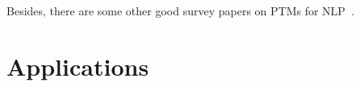 \documentclass[fleqn]{SCYE-arxiv}
\begin{document}
\begin{multicols}{2}
Besides, there are some other good survey papers on PTMs for NLP~\cite{wang2020static,liu2020survey,rogers2020primer}.



%
%
%



\section{Applications}
\label{sec:app}


\end{multicols}
\end{document}
